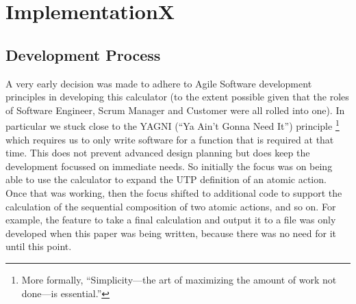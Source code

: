 \section{ImplementationX}\label{sec:ImplX}


\subsection{Development Process}\label{ssec:development}

A very early decision was made to adhere to Agile Software development
principles \cite{Fowl01a}
in developing this calculator
(to the extent possible given that the roles of Software Engineer, Scrum Manager
and Customer were all rolled into one).
In particular we stuck close to the YAGNI (``Ya Ain't Gonna Need It'') principle%
\footnote{More formally, ``Simplicity---the art of maximizing the amount
of work not done---is essential.''}
which requires us to only write software for a function
that is required at that time.
This does not prevent advanced design planning but does keep
the development focussed on immediate needs.
So initially the focus was on being able to use the calculator
to expand the UTP definition of an atomic action.
Once that was working, then the focus shifted to additional code to
support the calculation of the sequential composition of two atomic actions,
and so on.
For example, the feature to take a final calculation and output it to a file
was only developed when this paper was being written,
because there was no need for it until this point.
